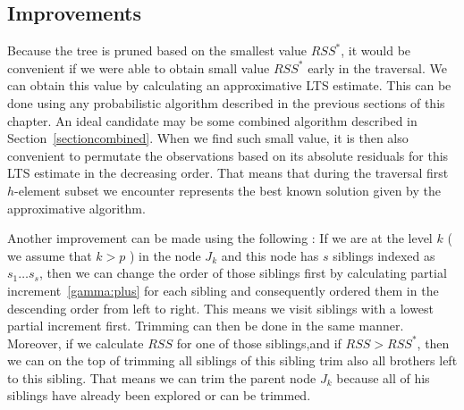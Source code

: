 \subsection{Improvements}
Because the tree is pruned based on the smallest value $RSS^*$, it would be convenient if we were able to obtain small value $RSS^*$ early in the traversal. We can obtain this value by calculating an approximative LTS estimate. This can be done using any probabilistic algorithm described in the previous sections of this chapter. An ideal candidate may be some combined algorithm described in Section~\ref{sectioncombined}. When we find such small value, it is then also convenient to permutate the observations based on its absolute residuals for this LTS estimate in the decreasing order. That means that during the traversal first $h$-element subset we encounter represents the best known solution given by the approximative algorithm.

Another improvement can be made using the following : If we are at the level $k$ ( we assume that $k > p$ )
in the node $J_k$ and this node has $s$ siblings indexed as $s_1 \ldots s_s$, then we can change the order of those siblings first by calculating partial increment~\eqref{gamma:plus} for each sibling and consequently ordered them in the descending order from left to right. This means we visit siblings with a lowest partial increment first. Trimming can then be done in the same manner. Moreover, if we calculate $RSS$ for one of those siblings,and if $RSS > RSS^*$, then we can on the top of trimming all siblings of this sibling trim also all brothers left to this sibling. That means we can trim the parent node $J_k$ because all of his siblings have already been explored or can be trimmed.





